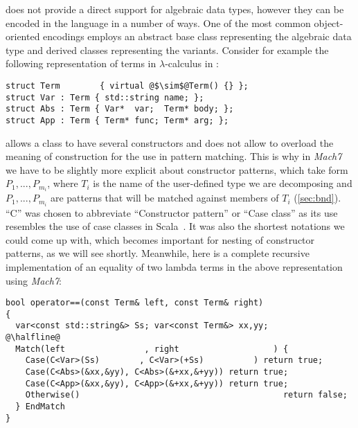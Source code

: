\Cpp{} does not provide a direct support for algebraic data types, however they 
can be encoded in the language in a number of ways. One of the most common 
object-oriented encodings employs an abstract base class representing the 
algebraic data type and derived classes representing the variants. Consider for 
example the following representation of terms in $\lambda$-calculus in \Cpp{}:

\begin{lstlisting}[columns=flexible]
struct Term        { virtual @$\sim$@Term() {} };
struct Var : Term { std::string name; };
struct Abs : Term { Var*  var;  Term* body; };
struct App : Term { Term* func; Term* arg; };
\end{lstlisting}

\noindent
\Cpp{} allows a class to have several constructors and does not allow to 
overload the meaning of construction for the use in pattern matching. This is 
why in \emph{Mach7} we have to be slightly more explicit about constructor patterns, 
which take form $P_1,...,P_{m_i}$\code{)}, where $T_i$ is the name of 
the user-defined type we are decomposing and $P_1,...,P_{m_i}$ are patterns that 
will be matched against members of $T_i$ (\textsection\ref{sec:bnd}). ``C'' was
chosen to abbreviate ``Constructor pattern'' or ``Case class'' as its use 
resembles the use of case classes in Scala~\cite{Scala2nd}. It was also the 
shortest notations we could come up with, which becomes important for nesting of 
constructor patterns, as we will see shortly. Meanwhile, here is a complete 
recursive implementation of an equality of two lambda terms in the above 
representation using \emph{Mach7}:

\begin{lstlisting}[keepspaces]
bool operator==(const Term& left, const Term& right)
{
  var<const std::string&> Ss; var<const Term&> xx,yy;
@\halfline@
  Match(left                , right                   ) {
    Case(C<Var>(Ss)        , C<Var>(+Ss)          ) return true;
    Case(C<Abs>(&xx,&yy), C<Abs>(&+xx,&+yy)) return true;
    Case(C<App>(&xx,&yy), C<App>(&+xx,&+yy)) return true;
    Otherwise()                                         return false;
  } EndMatch
}
\end{lstlisting}

